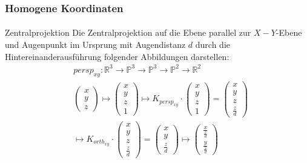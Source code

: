 \documentclass{beamer}
\begin{document}
\begin{frame}
    \frametitle{Homogene Koordinaten}
\framesubtitle{}
\begin{block}{Zentralprojektion}
Die Zentralprojektion auf die Ebene parallel zur $X-Y$-Ebene und Augenpunkt im Ursprung mit Augendistanz $d$ durch die Hintereinanderausführung folgender Abbildungen darstellen:
\begin{align*}
& persp_{xy} :\mathbb{R}^3   \to \mathbb{P}^3    \to  \mathbb{P}^3    \to \mathbb{P}^2    \to \mathbb{R}^2  \\
&\begin{pmatrix} x \\ y \\ z \end{pmatrix} \mapsto \begin{pmatrix} x \\ y \\ z \\ 1 \end{pmatrix}   \mapsto K_{persp_{xy}} \cdot  \begin{pmatrix} x \\ y \\ z \\ 1 \end{pmatrix} =   \begin{pmatrix} x \\ y \\ z \\ \frac{z}{d}  \end{pmatrix} \\
 & \mapsto K_{orth_{xy}} \cdot   \begin{pmatrix} x \\ y \\ z \\ \frac{z}{d}  \end{pmatrix}=   \begin{pmatrix} x \\ y \\ \frac{z}{d} \end{pmatrix}   \mapsto 
 \begin{pmatrix}  \frac{x}{\frac{z}{d} } \\   \frac{y}{\frac{z}{d} } \end{pmatrix}
 \end{align*}

\end{block}
\end{frame}
\end{document}
